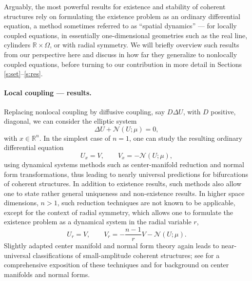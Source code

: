 \documentclass[10pt]{article}
\newcommand{\R}{\mathbb{R}}
\newcommand{\Nl}{\mathcal{N}}
\begin{document}
Arguably, the most powerful results for existence and stability of coherent structures rely on formulating the existence problem as an ordinary differential equation, a method sometimes referred to as ``spatial dynamics'' \cite{sandtw} --- for locally coupled equations, in essentially one-dimensional geometries such as the real line, cylinders $\R\times\Omega$, or with radial symmetry. We will briefly overview such results from our perspective here and discuss in how far they generalize to nonlocally coupled equations, before turning to our contribution in more detail in Sections \ref{s:set}--\ref{s:res}. 


\paragraph{Local coupling --- results.} 
Replacing nonlocal coupling by diffusive coupling, say $D\Delta U$, with $D$ positive, diagonal, we can consider  the elliptic system 
\begin{equation}\label{e:rd}
\Delta U + \Nl(U;\mu)=0,
\end{equation}
with $x\in\R^n$. In the simplest case of $n=1$, one can study the resulting ordinary differential equation 
\begin{equation*}
U_x=V,\qquad 
V_x=-\Nl(U;\mu),
\end{equation*}
using dynamical systems methods such as center-manifold reduction and normal form transformations, thus leading to nearly universal predictions for bifurcations of coherent structures. In addition to existence results, such methods also allow one to state rather general uniqueness and non-existence results. In higher space dimensions, $n>1$, such reduction techniques are not known to be applicable, except for the context of radial symmetry, which allows one to formulate the existence problem as a dynamical system in the radial variable $r$, 
\begin{equation*}
U_r=V,\qquad
V_r=-\frac{n-1}{r}V-\Nl(U;\mu).
\end{equation*}
Slightly adapted center manifold and normal form theory again leads to near-universal classifications of small-amplitude coherent structures; see \cite{Srad} for a comprehensive exposition of these techniques and \cite{harioo} for background on center manifolds and normal forms. 
\end{document}
